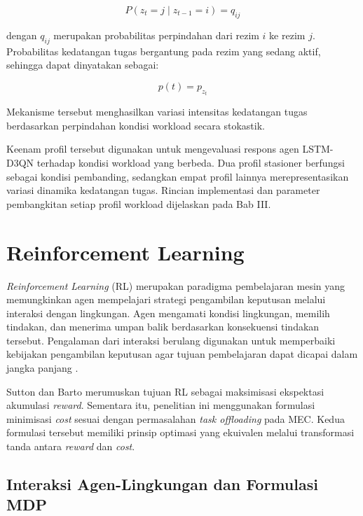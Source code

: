 \begin{equation}
\label{eq:transisi_rezim_markov}
P(z_t=j\mid z_{t-1}=i)=q_{ij}
\end{equation}

dengan $q_{ij}$ merupakan probabilitas perpindahan dari rezim $i$ ke rezim $j$. Probabilitas kedatangan tugas bergantung pada rezim yang sedang aktif, sehingga dapat dinyatakan sebagai:

\begin{equation}
\label{eq:probabilitas_arrival_markov}
p(t)=p_{z_t}
\end{equation}

Mekanisme tersebut menghasilkan variasi intensitas kedatangan tugas berdasarkan perpindahan kondisi workload secara stokastik.

Keenam profil tersebut digunakan untuk mengevaluasi respons agen LSTM-D3QN terhadap kondisi workload yang berbeda. Dua profil stasioner berfungsi sebagai kondisi pembanding, sedangkan empat profil lainnya merepresentasikan variasi dinamika kedatangan tugas. Rincian implementasi dan parameter pembangkitan setiap profil workload dijelaskan pada Bab III.

\vspace{1cm}
\section{Reinforcement Learning}
\label{sec:reinforcement_learning}

\textit{Reinforcement Learning} (RL) merupakan paradigma pembelajaran mesin yang memungkinkan agen mempelajari strategi pengambilan keputusan melalui interaksi dengan lingkungan. Agen mengamati kondisi lingkungan, memilih tindakan, dan menerima umpan balik berdasarkan konsekuensi tindakan tersebut. Pengalaman dari interaksi berulang digunakan untuk memperbaiki kebijakan pengambilan keputusan agar tujuan pembelajaran dapat dicapai dalam jangka panjang \cite{suttonbarto2018}.

Sutton dan Barto \cite{suttonbarto2018} merumuskan tujuan RL sebagai maksimisasi ekspektasi akumulasi \textit{reward}. Sementara itu, penelitian ini menggunakan formulasi minimisasi \textit{cost} sesuai dengan permasalahan \textit{task offloading} pada MEC. Kedua formulasi tersebut memiliki prinsip optimasi yang ekuivalen melalui transformasi tanda antara \textit{reward} dan \textit{cost}.

\vspace{1cm}
\subsection{Interaksi Agen-Lingkungan dan Formulasi MDP}
\label{subsec:interaksi_agen_lingkungan_mdp}


